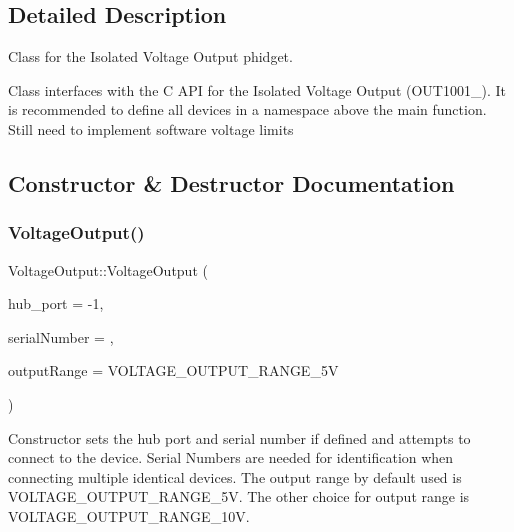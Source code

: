 \subsection{Detailed Description}
Class for the Isolated Voltage Output phidget. 

Class interfaces with the C A\+PI for the Isolated Voltage Output (O\+U\+T1001\+\_). It is recommended to define all devices in a namespace above the main function. Still need to implement software voltage limits 

\subsection{Constructor \& Destructor Documentation}
\mbox{\label{classVoltageOutput_ae75a945e1fdd2f2706e19f7b65035f21}} 
\subsubsection{\texorpdfstring{Voltage\+Output()}{VoltageOutput()}}
{\footnotesize\ttfamily Voltage\+Output\+::\+Voltage\+Output (\begin{DoxyParamCaption}\item[{int}]{hub\+\_\+port = {\ttfamily -\/1},  }\item[{int}]{serial\+Number = {},  }\item[{Phidget\+Voltage\+Output\+\_\+\+Voltage\+Output\+Range}]{output\+Range = {\ttfamily VOLTAGE\+\_\+OUTPUT\+\_\+RANGE\+\_\+5V} }\end{DoxyParamCaption})\hspace{0.3cm}{\ttfamily [inline]}}

Constructor sets the hub port and serial number if defined and attempts to connect to the device. Serial Numbers are needed for identification when connecting multiple identical devices. The output range by default used is V\+O\+L\+T\+A\+G\+E\+\_\+\+O\+U\+T\+P\+U\+T\+\_\+\+R\+A\+N\+G\+E\+\_\+5V. The other choice for output range is V\+O\+L\+T\+A\+G\+E\+\_\+\+O\+U\+T\+P\+U\+T\+\_\+\+R\+A\+N\+G\+E\+\_\+10V.\mbox{\label{classVoltageOutput_a15d66c37a266d47cc8cab240b6f75f2d}} 
